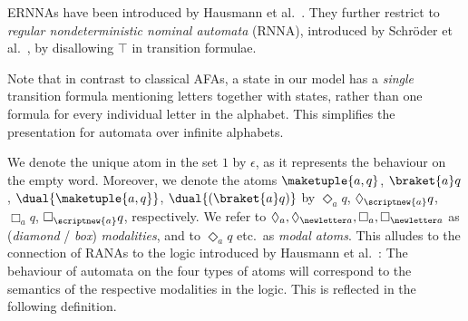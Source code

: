 \documentclass[10pt, final, conference, a4paper, twocolumn]{IEEEtran}
\begin{document}
\begin{rem} \label{rem:equivRNNA}
  ERNNAs have been introduced by Hausmann et al.~\cite{hms21}. They further restrict to \emph{regular nondeterministic nominal automata} (RNNA), introduced by Schröder et al.~\cite{skmw17}, by disallowing $\top$ in transition formulae.
\end{rem}

\noindent Note that in contrast to classical AFAs, a state in our
model has a \emph{single} transition formula mentioning letters
together with states, rather than one formula for every individual
letter in the alphabet. This simplifies the presentation for automata
over infinite alphabets.


\begin{notation}
  We denote the unique atom in the set $1$ by $\epsilon$, as it
  represents the behaviour on the empty word. Moreover, we denote the
  atoms $\maketuple{a,q}$, $\braket{a}q$, $\dual{\maketuple{a,q}}$,
  $\dual{\left(\braket{a}q\right)}$ by $\Diamond_a q$,
  $\Diamond_{\scriptnew{a}} q$, $\Box_a q$, $\Box_{\scriptnew{a}} q$,
  respectively.  We refer to $\Diamond_a,\Diamond_{\newletter
    a},\Box_a,\Box_{\newletter a}$ as
  (\emph{diamond} / \emph{box}) \emph{modalities}, and to $\Diamond_a q$
  etc.\ as \emph{modal atoms}.  This alludes to the connection
  of RANAs to the logic \muBar introduced by Hausmann et
  al.~\cite{hms21}: The behaviour of automata on the four types of
  atoms will correspond to the semantics of the respective modalities
  in the logic. This is reflected in the following definition.
\end{notation}
\end{document}
